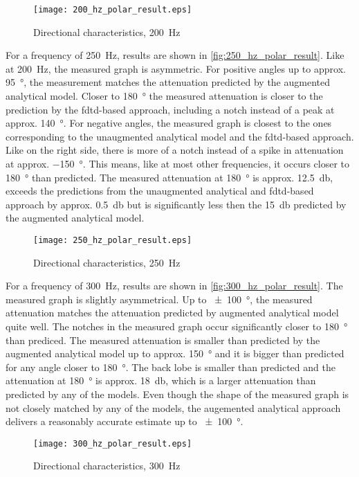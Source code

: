  \begin{figure}[H]
	\centering
	\texttt{[image: 200\_hz\_polar\_result.eps]}
	\caption{Directional characteristics, \SI{200}{\hertz}}
		\label{fig:200_hz_polar_result}
\end{figure}
For a frequency of \SI{250}{\hertz}, results are shown in \autoref{fig:250_hz_polar_result}.
Like at \SI{200}{\hertz}, the measured graph is asymmetric. For positive angles up to approx. \SI{95}{\degree}, the measurement matches the attenuation predicted by the augmented analytical model. Closer to \SI{180}{\degree} the measured attenuation is closer to the prediction by the \gls{fdtd}-based approach, including a notch instead of a peak at approx. \SI{140}{\degree}. For negative angles, the measured graph is closest to the ones corresponding to the unaugmented analytical model and the \gls{fdtd}-based approach. Like on the right side, there is more of a notch instead of a spike in attenuation at approx. \SI{-150}{\degree}. This means, like at most other frequencies, it occurs closer to \SI{180}{\degree} than predicted. The measured attenuation at \SI{180}{\degree} is approx. \SI{12.5}{\decibel}, exceeds the predictions from the unaugmented analytical and \gls{fdtd}-based approach by approx. \SI{0.5}{\decibel} but is significantly less then the \SI{15}{\decibel} predicted by the augmented analytical model.
 \begin{figure}[H]
	\centering
	\texttt{[image: 250\_hz\_polar\_result.eps]}
	\caption{Directional characteristics, \SI{250}{\hertz}}
		\label{fig:250_hz_polar_result}
\end{figure}
For a frequency of \SI{300}{\hertz}, results are shown in \autoref{fig:300_hz_polar_result}. The measured graph is slightly asymmetrical. Up to \SI{\pm 100}{\degree}, the measured attenuation matches the attenuation predicted by augmented analytical model quite well. The notches in the measured graph occur significantly closer to \SI{180}{\degree} than prediced. The measured attenuation is smaller than predicted by the augmented analytical model up to approx. \SI{150}{\degree} and it is bigger than predicted for any angle closer to \SI{180}{\degree}. The back lobe is smaller than predicted and the attenuation at \SI{180}{\degree} is approx. \SI{18}{\decibel}, which is a larger attenuation than predicted by any of the models. Even though the shape of the measured graph is not closely matched by any of the models, the augemented analytical approach delivers a reasonably accurate estimate up to \SI{\pm 100}{\degree}.
 \begin{figure}[H]
	\centering
	\texttt{[image: 300\_hz\_polar\_result.eps]}
	\caption{Directional characteristics, \SI{300}{\hertz}}
		\label{fig:300_hz_polar_result}
\end{figure}


